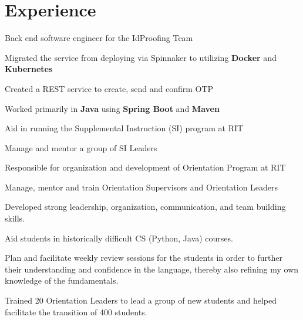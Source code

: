 \documentclass[]{deedy-resume-openfont}
\begin{document}
\hfill
\begin{minipage}[t]{0.67\textwidth}


\section{Experience}
\vspace{\topsep} %
\begin{tightemize}
  \item Back end software engineer for the IdProofing Team
  \item Migrated the service from deploying via Spinnaker to utilizing \textbf{Docker} and \textbf{Kubernetes}
  \item Created a REST service to create, send and confirm OTP
  \item Worked primarily in \textbf{Java} using \textbf{Spring Boot} and \textbf{Maven}
\end{tightemize}
\sectionsep

\begin{tightemize}
  \item Aid in running the Supplemental Instruction (SI) program at RIT
  \item Manage and mentor a group of SI Leaders
\end{tightemize}
\begin{tightemize}
  \item Responsible for organization and development of Orientation Program at RIT
  \item Manage, mentor and train Orientation Supervisors and Orientation Leaders
  \item Developed strong leadership, organization, communication, and team building skills.
\end{tightemize}
\begin{tightemize}
  \item Aid students in historically difficult CS (Python, Java) courses.
  \item Plan and facilitate weekly review sessions for the students in order to further their understanding and confidence in the language, thereby also refining my own knowledge of the fundamentals.
\end{tightemize}
\begin{tightemize}
  \item Trained 20 Orientation Leaders to lead a group of new students and helped facilitate the transition of 400 students.
\end{tightemize}
\sectionsep


\end{minipage}
\end{document}
